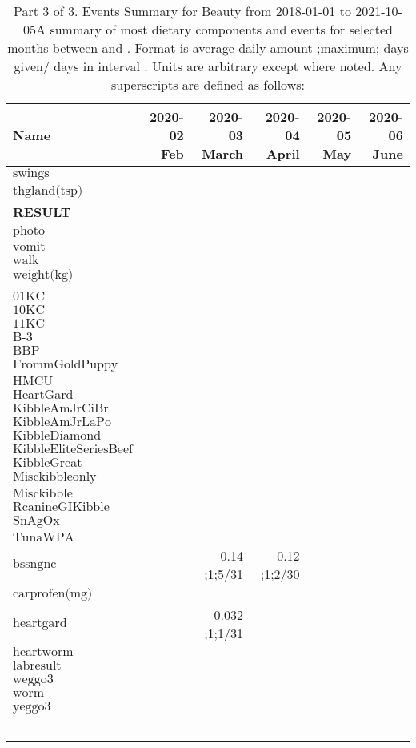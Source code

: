 \begin{table}[H]
\centering
\begin{tabular}{|l|r|r|r|r|r|}
\hline
Name&2020-02 Feb&2020-03 March&2020-04 April&2020-05 May&2020-06 June\\
\hline
$\textrm{swings}$&&&&&\\
$\textrm{thgland(tsp)}$&&&&&\\
{\bf RESULT}&&&&&\\
$\textrm{photo}$&&&&&\\
$\textrm{vomit}$&&&&&\\
$\textrm{walk}$&&&&&\\
$\textrm{weight(kg)}$&&&&&\\
&&&&&\\
$\textrm{01KC}$&&&&&\\
$\textrm{10KC}$&&&&&\\
$\textrm{11KC}$&&&&&\\
$\textrm{B-3}$&&&&&\\
$\textrm{BBP}$&&&&&\\
$\textrm{FrommGoldPuppy}$&&&&&\\
$\textrm{HMCU}$&&&&&\\
$\textrm{HeartGard}$&&&&&\\
$\textrm{KibbleAmJrCiBr}$&&&&&\\
$\textrm{KibbleAmJrLaPo}$&&&&&\\
$\textrm{KibbleDiamond}$&&&&&\\
$\textrm{KibbleEliteSeriesBeef}$&&&&&\\
$\textrm{KibbleGreat}$&&&&&\\
$\textrm{Misckibbleonly}$&&&&&\\
$\textrm{Misckibble}$&&&&&\\
$\textrm{RcanineGIKibble}$&&&&&\\
$\textrm{SnAgOx}$&&&&&\\
$\textrm{TunaWPA}$&&&&&\\
$\textrm{bssngnc}$&&0.14 ;1;5/31&0.12 ;1;2/30&&\\
$\textrm{carprofen(mg)}$&&&&&\\
$\textrm{heartgard}$&&0.032 ;1;1/31&&&\\
$\textrm{heartworm}$&&&&&\\
$\textrm{labresult}$&&&&&\\
$\textrm{weggo3}$&&&&&\\
$\textrm{worm}$&&&&&\\
$\textrm{yeggo3}$&&&&&\\
&&&&&\\
&&&&&\\
&&&&&\\
&&&&&\\
&&&&&\\
\hline
\end{tabular}
\caption{Part 3 of 3.  Events Summary for Beauty   from 2018-01-01 to 2021-10-05A summary of most dietary components and events  for selected months between \mjmdatemin and \mjmdatemax. Format is average daily amount ;maximum; days given/ days in interval . Units are arbitrary except where noted. Any  superscripts are defined as follows:  \mjmsuperscripts}
\end{table}
